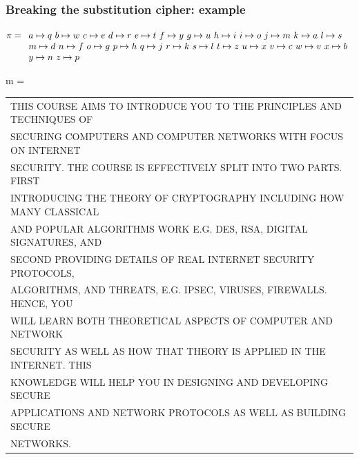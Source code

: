 \documentclass[aspectratio=169, lualatex, handout, 10pt,dvipsnames,svgnames]{beamer} %
\def\enbleu#1{\textcolor{bleu}{#1}}
\def\enrouge#1{\textcolor{rouge}{#1}}
\begin{document}
\begin{frame}
  \frametitle{Breaking the substitution cipher: example}
  
  \enrouge{
    \tiny{$\pi=
      \begin{array}[t]{l}
        a\mapsto q\ b\mapsto w\ c\mapsto e\ d\mapsto r\ e\mapsto t\ f\mapsto y\ g\mapsto u\ h\mapsto i\ 
        i\mapsto o\ j\mapsto m\ k\mapsto a\ l\mapsto s \\ 
        m\mapsto d\ n\mapsto f\ o\mapsto g\ p\mapsto h\ q\mapsto j\ r\mapsto k\ s\mapsto l\ t\mapsto z\ 
        u\mapsto x\ v\mapsto c\ w\mapsto v\ x\mapsto b \\ 
        y\mapsto n\ z\mapsto p\
      \end{array}
      $}}
  \vspace{0.25cm}


  \enbleu{
  \tiny{m =
      \begin{tabular}[t]{l}
        THIS COURSE AIMS TO INTRODUCE YOU TO THE PRINCIPLES AND TECHNIQUES OF \\ 
        SECURING COMPUTERS AND COMPUTER NETWORKS WITH FOCUS ON INTERNET \\
        SECURITY. THE COURSE IS EFFECTIVELY SPLIT INTO TWO PARTS. FIRST \\ 
        INTRODUCING THE THEORY OF CRYPTOGRAPHY INCLUDING HOW MANY CLASSICAL \\
        AND POPULAR ALGORITHMS WORK E.G. DES, RSA, DIGITAL SIGNATURES, AND \\
        SECOND PROVIDING DETAILS OF REAL INTERNET SECURITY PROTOCOLS, \\
        ALGORITHMS, AND THREATS, E.G. IPSEC, VIRUSES, FIREWALLS. HENCE, YOU \\
        WILL LEARN BOTH THEORETICAL ASPECTS OF COMPUTER AND NETWORK \\
        SECURITY AS WELL AS HOW THAT THEORY IS APPLIED IN THE INTERNET. THIS \\
        KNOWLEDGE WILL HELP YOU IN DESIGNING AND DEVELOPING SECURE \\
        APPLICATIONS AND NETWORK PROTOCOLS AS WELL AS BUILDING SECURE \\
        NETWORKS.
      \end{tabular}
  }}
  \vspace{0.5cm}

  \normalsize
  \color{black}{Going back to letter frequency and a few more guesses!!}
    \color{black}
\end{frame}
\end{document}
